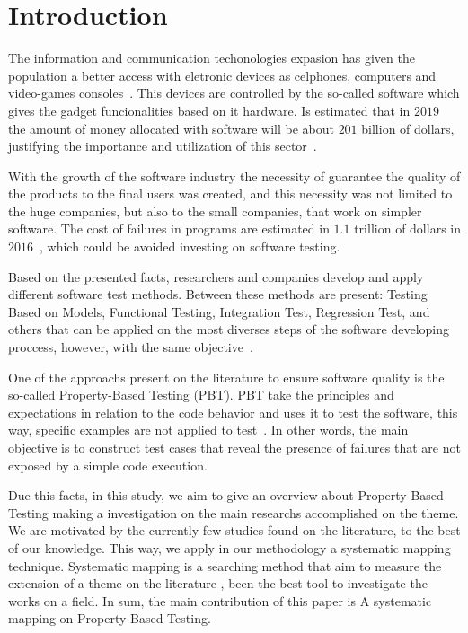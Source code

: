 \section{Introduction}

	The information and communication techonologies expasion has given the population a better access with eletronic devices as celphones, computers and video-games consoles~\cite{tics}. This devices are controlled by the so-called software which gives the gadget funcionalities based on it hardware. Is estimated that in $2019$ the amount of money allocated with software will be about $201$ billion of dollars, justifying the importance and utilization of this sector~\cite{tendencies}.

	With the growth of the software industry the necessity of guarantee the quality of the products to the final users was created, and this necessity was not limited to the huge companies, but also to the small companies, that work on simpler software. The cost of failures in programs are estimated in $1.1$ trillion of dollars in $2016$~\cite{failures}, which could be avoided investing on software testing.

	Based on the presented facts, researchers and companies develop and apply different software test methods. Between these methods are present: Testing Based on Models, Functional Testing, Integration Test, Regression Test, and others that can be applied on the most diverses steps of the software developing proccess, however, with the same objective~\cite{paiva2016aplicaccao}.

	One of the approachs present on the literature to ensure software quality is the so-called Property-Based Testing (PBT). PBT take the principles and expectations in relation to the code behavior and uses it to test the software, this way, specific examples are not applied to test~\cite{fink1997property}. In other words, the main objective is to construct test cases that reveal the presence of failures that are not exposed by a simple code execution.


	Due this facts, in this study, we aim to give an overview about Property-Based Testing making a investigation on the main researchs accomplished on the theme. We are motivated by the currently few studies found on the literature, to the best of our knowledge. This way, we apply in our methodology a systematic mapping technique. Systematic mapping is a searching method that aim to measure the extension of a theme on the literature \cite{petersen2008systematic}, been the best tool to investigate the works on a field. In sum, the main contribution of this paper is A systematic mapping on Property-Based Testing. %